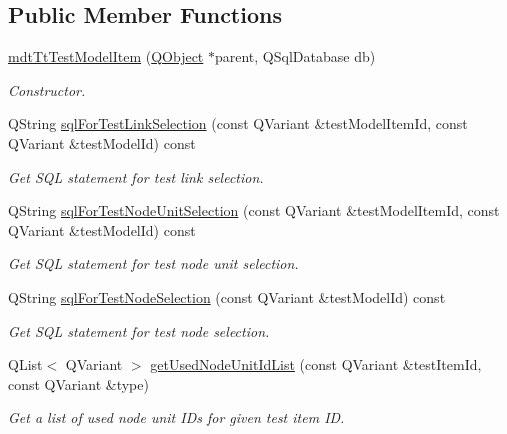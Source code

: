 \subsection*{Public Member Functions}
\begin{DoxyCompactItemize}
\item 
\hyperlink{classmdt_tt_test_model_item_aa410b11d0b8f92dda5e0317f1ecd33ca}{mdt\-Tt\-Test\-Model\-Item} (\hyperlink{class_q_object}{Q\-Object} $\ast$parent, Q\-Sql\-Database db)
\begin{DoxyCompactList}\small\item\em Constructor. \end{DoxyCompactList}\item 
Q\-String \hyperlink{classmdt_tt_test_model_item_af55369643e6640544384ebf0f1b9782e}{sql\-For\-Test\-Link\-Selection} (const Q\-Variant \&test\-Model\-Item\-Id, const Q\-Variant \&test\-Model\-Id) const 
\begin{DoxyCompactList}\small\item\em Get S\-Q\-L statement for test link selection. \end{DoxyCompactList}\item 
Q\-String \hyperlink{classmdt_tt_test_model_item_ad9556478313d628d6b9b505137fc318e}{sql\-For\-Test\-Node\-Unit\-Selection} (const Q\-Variant \&test\-Model\-Item\-Id, const Q\-Variant \&test\-Model\-Id) const 
\begin{DoxyCompactList}\small\item\em Get S\-Q\-L statement for test node unit selection. \end{DoxyCompactList}\item 
Q\-String \hyperlink{classmdt_tt_test_model_item_a7a69b5c9d52fd3d6c8c78d16b86d1165}{sql\-For\-Test\-Node\-Selection} (const Q\-Variant \&test\-Model\-Id) const 
\begin{DoxyCompactList}\small\item\em Get S\-Q\-L statement for test node selection. \end{DoxyCompactList}\item 
Q\-List$<$ Q\-Variant $>$ \hyperlink{classmdt_tt_test_model_item_a0666954f17eab46ef9ef974542486446}{get\-Used\-Node\-Unit\-Id\-List} (const Q\-Variant \&test\-Item\-Id, const Q\-Variant \&type)
\begin{DoxyCompactList}\small\item\em Get a list of used node unit I\-Ds for given test item I\-D. \end{DoxyCompactList}\item 

\end{DoxyCompactItemize}
